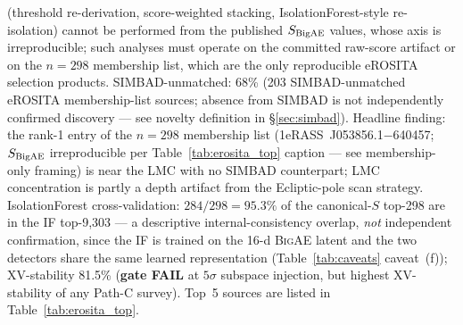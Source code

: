 \documentclass[aps,prd,twocolumn,superscriptaddress,showpacs,preprintnumbers,nofootinbib,longbibliography,floatfix]{revtex4-2}
\newcommand{\BigAE}{\textsc{BigAE}}
\begin{document}
(threshold re-derivation, score-weighted stacking, IsolationForest-style re-isolation) cannot be performed from the published $S_{\rm BigAE}$ values, whose axis is irreproducible; such analyses must operate on the committed raw-score artifact or on the $n = 298$ membership list, which are the only reproducible eROSITA selection products. SIMBAD-unmatched: 68\% (203 SIMBAD-unmatched eROSITA membership-list sources; absence from SIMBAD is not independently confirmed discovery --- see novelty definition in \S\ref{sec:simbad}). Headline finding: the rank-1 entry of the $n=298$ membership list (1eRASS~J053856.1$-$640457; $S_{\rm BigAE}$ irreproducible per Table~\ref{tab:erosita_top} caption --- see membership-only framing) is near the LMC with no SIMBAD counterpart; LMC concentration is partly a depth artifact from the Ecliptic-pole scan strategy. IsolationForest cross-validation: $284/298 = 95.3\%$ of the canonical-$S$ top-298 are in the IF top-9{,}303 --- a descriptive internal-consistency overlap, \emph{not} independent confirmation, since the IF is trained on the 16-d \BigAE{} latent and the two detectors share the same learned representation (Table~\ref{tab:caveats} caveat~(f)); XV-stability 81.5\% (\textbf{gate FAIL} at $5\sigma$ subspace injection, but highest XV-stability of any Path-C survey). Top~5 sources are listed in Table~\ref{tab:erosita_top}.
\end{document}
